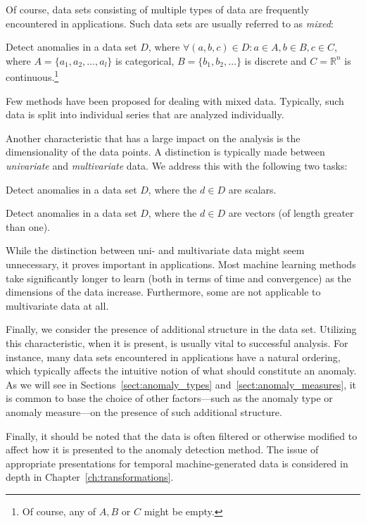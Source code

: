 Of course, data sets consisting of multiple types of data are frequently encountered in applications. Such data sets are usually referred to as \emph{mixed}:
\begin{task}
  Detect anomalies in a data set $D$, where $\forall (a, b, c) \in D: a \in A, b \in B, c \in C$, where $A = \{a_1, a_2, \dots, a_l\}$ is categorical, $B = \{b_1, b_2, \dots\}$ is discrete and $C = \mathbb{R}^n$ is continuous.\footnote{Of course, any of $A, B$ or $C$ might be empty.}
\end{task}

Few methods have been proposed for dealing with mixed data. Typically, such data is split into individual series that are analyzed individually.

Another characteristic that has a large impact on the analysis is the dimensionality of the data points. A distinction is typically made between \emph{univariate} and \emph{multivariate} data. We address this with the following two tasks:
\begin{task}
  Detect anomalies in a data set $D$, where the $d \in D$ are scalars.
\end{task}
\begin{task}
  Detect anomalies in a data set $D$, where the $d \in D$ are vectors (of length greater than one).
\end{task}
While the distinction between uni- and multivariate data might seem unnecessary, it proves important in applications. Most machine learning methods take significantly longer to learn (both in terms of time and convergence) as the dimensions of the data increase. Furthermore, some are not applicable to multivariate data at all.

Finally, we consider the presence of additional structure in the data set. Utilizing this characteristic, when it is present, is usually vital to successful analysis. For instance, many data sets encountered in applications have a natural ordering, which typically affects the intuitive notion of what should constitute an anomaly. As we will see in Sections~\ref{sect:anomaly_types} and~\ref{sect:anomaly_measures}, it is common to base the choice of other factors---such as the anomaly type or anomaly measure---on the presence of such additional structure.

Finally, it should be noted that the data is often filtered or otherwise modified to affect how it is presented to the anomaly detection method. The issue of appropriate presentations for temporal machine-generated data is considered in depth in Chapter~\ref{ch:transformations}.

